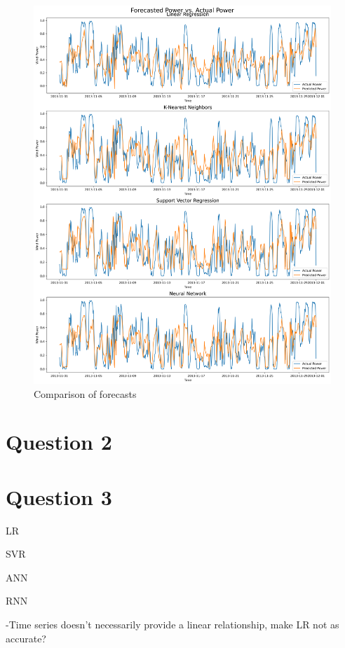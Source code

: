 \documentclass[a4paper, article, oneside, USenglish, IN5460]{memoir}
\begin{document}
\begin{figure}[H]
    \centering
    \includegraphics[width=1\linewidth]{fig/q1-ALL-forecast.png}
    \caption{Comparison of forecasts }
    \label{fig:q1-forecast-comparison}
\end{figure}


\chapter{Question 2}

\chapter{Question 3}

LR

SVR

ANN

RNN

-Time series doesn't necessarily provide a linear relationship, make LR not as accurate?
\end{document}

